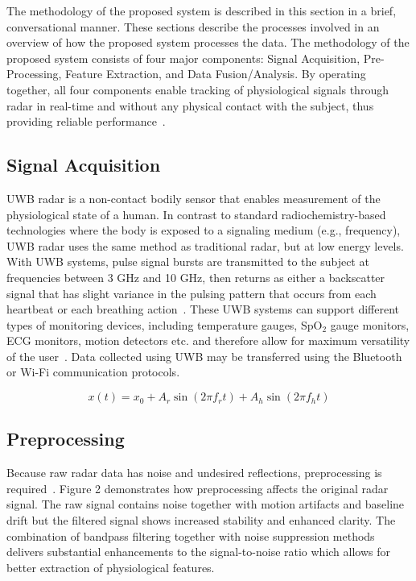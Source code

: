 \documentclass[conference]{IEEEtran}
\begin{document}
The methodology of the proposed system is described in this section in a brief, conversational manner. These sections describe the processes involved in an overview of how the proposed system processes the data. The methodology of the proposed system consists of four major components: Signal Acquisition, Pre-Processing, Feature Extraction, and Data Fusion/Analysis. By operating together, all four components enable tracking of physiological signals through radar in real-time and without any physical contact with the subject, thus providing reliable performance~\cite{ref1,ref12}.

\subsection{Signal Acquisition}

UWB radar is a non-contact bodily sensor that enables measurement of the physiological state of a human. In contrast to standard radiochemistry-based technologies where the body is exposed to a signaling medium (e.g., frequency), UWB radar uses the same method as traditional radar, but at low energy levels. With UWB systems, pulse signal bursts are transmitted to the subject at frequencies between 3 GHz and 10 GHz, then returns as either a backscatter signal that has slight variance in the pulsing pattern that occurs from each heartbeat or each breathing action~\cite{ref1,ref4}. These UWB systems can support different types of monitoring devices, including temperature gauges, SpO$_2$ gauge monitors, ECG monitors, motion detectors etc. and therefore allow for maximum versatility of the user~\cite{ref18,ref19}. Data collected using UWB may be transferred using the Bluetooth or Wi-Fi communication protocols.

\begin{equation}
x(t) = x_0 + A_r \sin(2\pi f_r t) + A_h \sin(2\pi f_h t)
\end{equation}

\subsection{Preprocessing}

Because raw radar data has noise and undesired reflections, preprocessing is required~\cite{ref6,ref8}.
Figure 2 demonstrates how preprocessing affects the original radar signal. The raw signal contains noise together with motion artifacts and baseline drift but the filtered signal shows increased stability and enhanced clarity. The combination of bandpass filtering together with noise suppression methods delivers substantial enhancements to the signal-to-noise ratio which allows for better extraction of physiological features.
\end{document}
